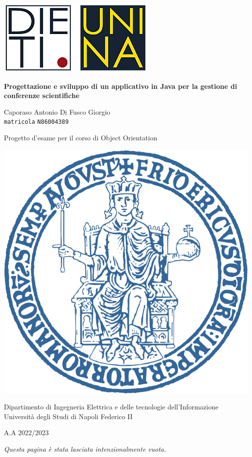 \documentclass[a4paper, oneside, 12pt]{book}
\begin{document}
\begin{titlepage}
\begin{center}

\includegraphics[scale=0.6]{Immagini/logo_dieti.png}
\vspace*{1cm}

{\Huge{\textbf{Progettazione e sviluppo di un applicativo in Java per la gestione di conferenze scientifiche}}}

\vspace{1.5cm}

{\Large Caporaso Antonio} \qquad \Large{Di Fusco Giorgio}\\
\texttt{matricola} \qquad \texttt{N86004389}

\vfill

Progetto d'esame per il corso di Object Orientation

\vspace{1cm}

\includegraphics[scale=1]{Immagini/LogoUnina.png}


Dipartimento di Ingegneria Elettrica e delle tecnologie dell'Informazione\\
Università degli Studi di Napoli Federico II


{\large{\textsc{A.A 2022/2023}}}
\end{center}
\end{titlepage}
\newpage
\textit{Questa pagina è stata lasciata intenzionalmente vuota.}
\newpage
\tableofcontents
\listoffigures
\listoftables
\end{document}
